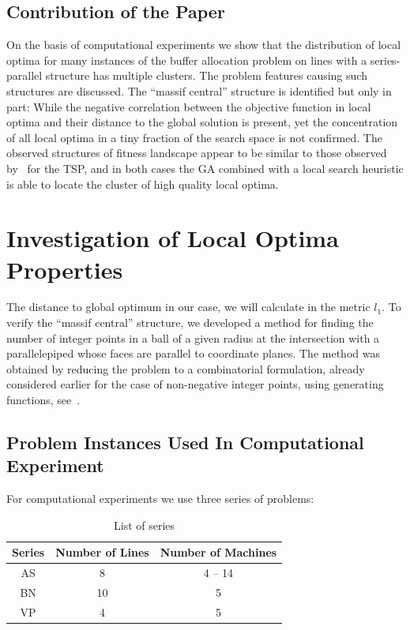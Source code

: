 \documentclass{ifacconf}
\begin{document}
\subsection{Contribution of the Paper}
On the basis of computational experiments we show that the distribution of local optima for many instances of the buffer allocation 
problem on lines with a series-parallel structure has multiple clusters. The problem features causing such structures
are discussed. The ``massif central'' structure is identified but only in part: 
While the negative correlation between the objective function in local optima and their distance to the global solution is present, yet the 
concentration of all 
local optima in a tiny fraction of the search space is not confirmed. The observed structures of fitness landscape appear to be similar 
to those observed by~\cite{Hains} for the TSP, and in both cases the GA combined with a local search heuristic is able to locate
the cluster of high quality local optima.

\section{Investigation of Local Optima Properties} \label{investigation}

The distance to global optimum
in our case, we will calculate in the metric $l_1$.
To verify the ``massif central'' structure, we developed a method 
for finding the number of integer points in
a ball of a given radius at the intersection with a parallelepiped
whose faces are parallel to coordinate planes.
The method
was obtained by reducing the problem to a combinatorial
formulation, already considered earlier for the case of non-negative
integer points, using
generating functions, see~\cite{Sach}.

\subsection{Problem Instances Used In Computational Experiment}\label{subsec:tasks}
For computational experiments we use three series of problems:
\begin{table}[!ht]
\centering
\small
\begin{tabular}{|c|c|c|}
\hline
Series&Number of Lines&Number of Machines\\
\hline
AS & 8 & 4 -- 14 \\
BN & 10 & 5 \\
VP & 4 & 5 \\
\hline
\end{tabular}
\caption{List of series}\label{tabl:series}
\vspace{-0.5cm}
\end{table}
\end{document}
